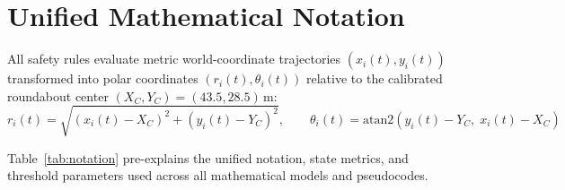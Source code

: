 \documentclass[12pt,a4paper]{report}
\begin{document}
\section{Unified Mathematical Notation}
\label{sec:notation}

All safety rules evaluate metric world-coordinate trajectories $(x_i(t), y_i(t))$ transformed into polar coordinates $(r_i(t), \theta_i(t))$ relative to the calibrated roundabout center $(X_C, Y_C) = (43.5, 28.5)$\,m:
\begin{equation}
    r_i(t) = \sqrt{(x_i(t) - X_C)^2 + (y_i(t) - Y_C)^2}, \qquad
    \theta_i(t) = \mathrm{atan2}(y_i(t) - Y_C,\;x_i(t) - X_C)
\end{equation}

Table~\ref{tab:notation} pre-explains the unified notation, state metrics, and threshold parameters used across all mathematical models and pseudocodes.
\end{document}
